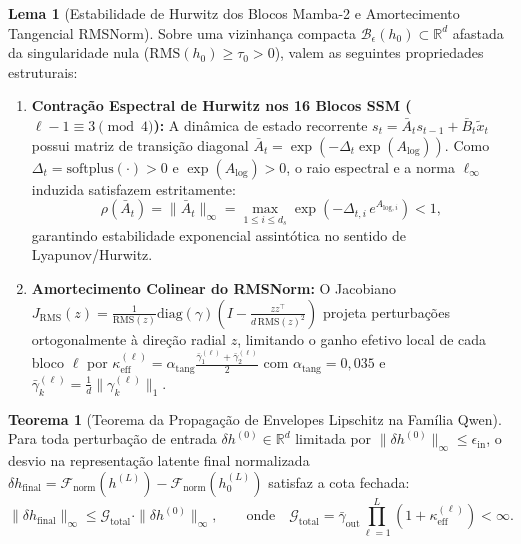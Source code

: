 \documentclass[11pt,a4paper]{article}
\theoremstyle{definition}
\newtheorem{theorem}{Teorema}
\newtheorem{lemma}{Lema}
\begin{document}
\begin{lemma}[Estabilidade de Hurwitz dos Blocos Mamba-2 e Amortecimento Tangencial RMSNorm]
\label{lem:qwen_local_bounds}
Sobre uma vizinhança compacta $\mathcal{B}_\epsilon(h_0) \subset \mathbb{R}^d$ afastada da singularidade nula ($\text{RMS}(h_0) \ge \tau_0 > 0$), valem as seguintes propriedades estruturais:
\begin{enumerate}
    \item \textbf{Contração Espectral de Hurwitz nos 16 Blocos SSM ($\ell - 1 \equiv 3 \pmod 4$):} A dinâmica de estado recorrente $s_t = \bar{A}_t s_{t-1} + \bar{B}_t \tilde{x}_t$ possui matriz de transição diagonal $\bar{A}_t = \exp(-\Delta_t \exp(A_{\text{log}}))$. Como $\Delta_t = \text{softplus}(\cdot) > 0$ e $\exp(A_{\text{log}}) > 0$, o raio espectral e a norma $\ell_\infty$ induzida satisfazem estritamente:
    \begin{equation}
        \rho(\bar{A}_t) = \|\bar{A}_t\|_\infty = \max_{1 \le i \le d_s} \exp\!\left(-\Delta_{t,i}\,e^{A_{\text{log},i}}\right) < 1,
    \end{equation}
    garantindo estabilidade exponencial assintótica no sentido de Lyapunov/Hurwitz.
    \item \textbf{Amortecimento Colinear do RMSNorm:} O Jacobiano $J_{\text{RMS}}(z) = \frac{1}{\text{RMS}(z)}\text{diag}(\gamma)\left(I - \frac{z z^\top}{d\,\text{RMS}(z)^2}\right)$ projeta perturbações ortogonalmente à direção radial $z$, limitando o ganho efetivo local de cada bloco $\ell$ por $\kappa_{\text{eff}}^{(\ell)} = \alpha_{\text{tang}} \frac{\bar{\gamma}_1^{(\ell)} + \bar{\gamma}_2^{(\ell)}}{2}$ com $\alpha_{\text{tang}} = 0{,}035$ e $\bar{\gamma}_k^{(\ell)} = \frac{1}{d}\|\gamma_k^{(\ell)}\|_1$.
\end{enumerate}
\end{lemma}

\begin{theorem}[Teorema da Propagação de Envelopes Lipschitz na Família Qwen]
\label{thm:qwen_lipschitz}
Para toda perturbação de entrada $\delta h^{(0)} \in \mathbb{R}^d$ limitada por $\|\delta h^{(0)}\|_\infty \le \epsilon_{\text{in}}$, o desvio na representação latente final normalizada $\delta h_{\text{final}} = \mathcal{F}_{\text{norm}}(h^{(L)}) - \mathcal{F}_{\text{norm}}(h_0^{(L)})$ satisfaz a cota fechada:
\begin{equation}
    \|\delta h_{\text{final}}\|_\infty \le \mathcal{G}_{\text{total}} \cdot \|\delta h^{(0)}\|_\infty, \qquad \text{onde} \quad \mathcal{G}_{\text{total}} = \bar{\gamma}_{\text{out}} \prod_{\ell=1}^L \left(1 + \kappa_{\text{eff}}^{(\ell)}\right) < \infty.
\end{equation}
\end{theorem}
\end{document}
